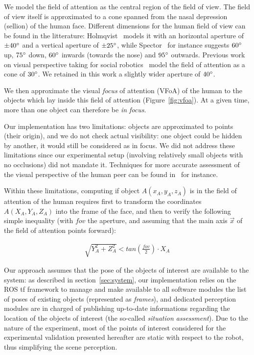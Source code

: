 \documentclass{sig-alternate}
\begin{document}
We model the field of attention as the central region of the field of view.  The
field of view itself is approximated to a cone spanned from the nasal depression
(sellion) of the human face. Different dimensions for the human field of view
can be found in the litterature: Holmqvist~\cite{holmqvist2011eye} models it
with an horizontal aperture of $ \pm 40\degree $ and a vertical aperture of $
\pm 25\degree $, while Spector~\cite{walker1980clinical} for instance suggests
$60\degree$ up, $75\degree$ down, $60\degree$ inwards (towards the nose) and
$95\degree$ outwards.  Previous work on visual perspective taking for social
robotics~\cite{sisbot2011situation} model the field of attention as a cone of
$30\degree$. We retained in this work a slightly wider aperture of $40\degree$.

We then approximate the visual \emph{focus} of attention (VFoA) of the human to the
objects which lay inside this field of attention (Figure~\ref{fig:vfoa}). At a
given time, more than one object can therefore be \emph{in focus}.

Our implementation has two limitations: objects are approximated to points
(their origin), and we do not
check actual visibility: one object could be hidden by another, it would still
be considered as in focus. We did not address these limitations since our
experimental setup (involving relatively small objects with no occlusions) did
not mandate it. Techniques for more accurate assessment of the visual
perspective of the human peer can be found in~\cite{sisbot2011situation} for instance.

Within these limitations, computing if object $A(x_A,y_A,z_A)$ is in the field
of attention of the human requires first to transform the coordinates
$A(X_A,Y_A,Z_A)$ into the frame of the face, and then to verify the following
simple inequality (with $fov$ the aperture, and assuming that the main axis
$\vec{x}$ of the field of attention points forward):

\begin{align}
    \sqrt{Y_A^2 + Z_A^2} < tan\left(\frac{fov}{2}\right) \cdot X_A
\label{eq:fov}
\end{align}

Our approach assumes that the pose of the objects of interest are available to
the system: as described in section~\ref{sec:system}, our implementation relies
on the ROS {\sc tf} framework to manage and make available to all software
modules the list of poses of existing objects (represented as {\it frames}), and
dedicated perception modules are in charged of publishing up-to-date
informations regarding the location of the objects of interest (the so-called
\emph{situation assessment}). Due to the nature of the experiment, most of the
points of interest considered for the experimental validation presented
hereafter are static with respect to the robot, thus simplifying the scene
perception.
\end{document}
